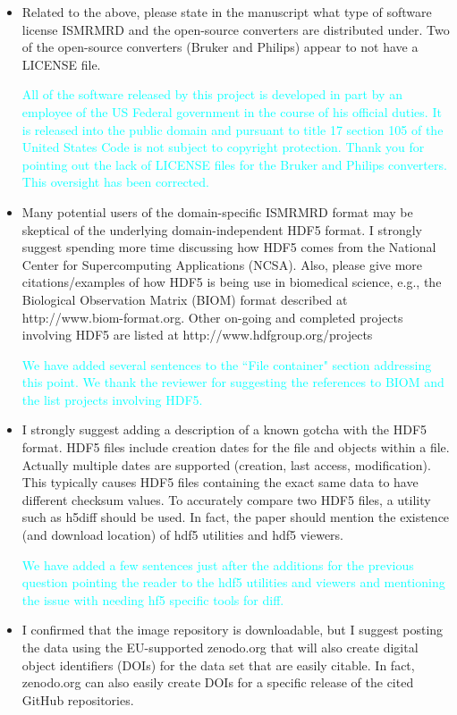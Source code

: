 \documentclass[12pt, draft]{article}
\makeatletter
\def\namedlabel#1#2{\begingroup#2\def\@currentlabel{#2}\phantomsection\label{#1}\endgroup}
\newcommand{\question}[1]{\item[\namedlabel{q#1}{#1}]}
\newcommand{\response}[1]{\textcolor{cyan}{#1}}
\makeatother
\begin{document}
{\begin{itemize}
\question{R2.9} Related to the above, please state in the manuscript what type of software license ISMRMRD and the open-source converters are distributed under. Two of the open-source converters (Bruker and Philips) appear to not have a LICENSE file.

\response{All of the software released by this project is developed in part by an employee of the US Federal government in the course of his official duties.  It is released into the public domain and pursuant to title 17 section 105 of the United States Code is not subject to copyright protection.  Thank you for pointing out the lack of LICENSE files for the Bruker and Philips converters.  This oversight has been corrected.}

\question{R2.10} Many potential users of the domain-specific ISMRMRD format may be skeptical of the underlying domain-independent HDF5 format. I strongly suggest spending more time discussing how HDF5 comes from the National Center for Supercomputing Applications (NCSA). Also, please give more citations/examples of how HDF5 is being use in biomedical science, e.g., the Biological Observation Matrix (BIOM) format described at http://www.biom-format.org. Other on-going and completed projects involving HDF5 are listed at http://www.hdfgroup.org/projects

\response{We have added several sentences to the ``File container" section addressing this point.  We thank the reviewer for suggesting the references to BIOM and the list projects involving HDF5.}

\question{R2.11} I strongly suggest adding a description of a known gotcha with the HDF5 format. HDF5 files include creation dates for the file and objects within a file. Actually multiple dates are supported (creation, last access, modification). This typically causes HDF5 files containing the exact same data to have different checksum values. To accurately compare two HDF5 files, a utility such as h5diff should be used. In fact, the paper should mention the existence (and download location) of hdf5 utilities and hdf5 viewers.

\response{We have added a few sentences just after the additions for the previous question pointing the reader to the hdf5 utilities and viewers and mentioning the issue with needing hf5 specific tools for diff.}

\question{R2.12} I confirmed that the image repository is downloadable, but I suggest posting the data using the EU-supported zenodo.org that will also create digital object identifiers (DOIs) for the data set that are easily citable. In fact, zenodo.org can also easily create DOIs for a specific release of the cited GitHub repositories.


\end{itemize}}
\end{document}
